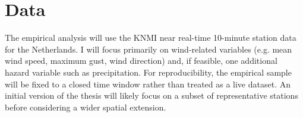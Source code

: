 \section*{Data}
The empirical analysis will use the KNMI near real-time 10-minute station data for the Netherlands. I will focus primarily on wind-related variables (e.g. mean wind speed, maximum gust, wind direction) and, if feasible, one additional hazard variable such as precipitation. For reproducibility, the empirical sample will be fixed to a closed time window rather than treated as a live dataset. An initial version of the thesis will likely focus on a subset of representative stations before considering a wider spatial extension.
